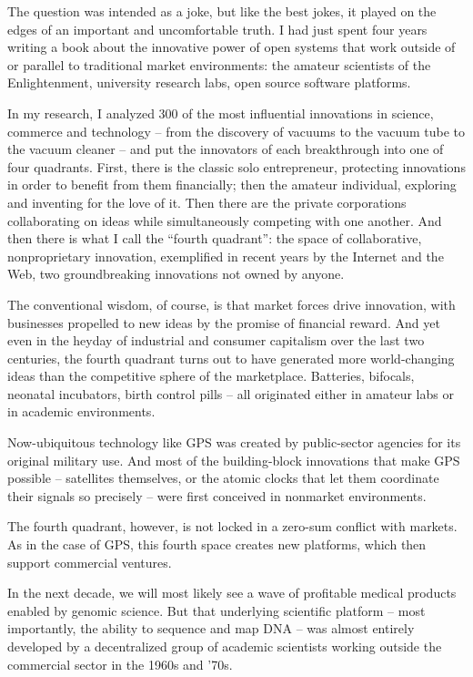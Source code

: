 ﻿\documentclass[12pt]{article}
\begin{document}
The question was intended as a joke, but like the best jokes, it played on the edges of an important
and uncomfortable truth. I had just spent four years writing a book about the innovative power of
open systems that work outside of or parallel to traditional market environments: the amateur
scientists of the Enlightenment, university research labs, open source software platforms.

In my research, I analyzed 300 of the most influential innovations in science, commerce and
technology -- from the discovery of vacuums to the vacuum tube to the vacuum cleaner -- and put the
innovators of each breakthrough into one of four quadrants. First, there is the classic solo
entrepreneur, protecting innovations in order to benefit from them financially; then the amateur
individual, exploring and inventing for the love of it. Then there are the private corporations
collaborating on ideas while simultaneously competing with one another. And then there is what I
call the ``fourth quadrant'': the space of collaborative, nonproprietary innovation, exemplified in
recent years by the Internet and the Web, two groundbreaking innovations not owned by anyone.

The conventional wisdom, of course, is that market forces drive innovation, with businesses
propelled to new ideas by the promise of financial reward. And yet even in the heyday of industrial
and consumer capitalism over the last two centuries, the fourth quadrant turns out to have generated
more world-changing ideas than the competitive sphere of the marketplace. Batteries, bifocals,
neonatal incubators, birth control pills -- all originated either in amateur labs or in academic
environments.

Now-ubiquitous technology like GPS was created by public-sector agencies for its original military
use. And most of the building-block innovations that make GPS possible -- satellites themselves, or
the atomic clocks that let them coordinate their signals so precisely -- were first conceived in
nonmarket environments.

The fourth quadrant, however, is not locked in a zero-sum conflict with markets. As in the case of
GPS, this fourth space creates new platforms, which then support commercial ventures.

In the next decade, we will most likely see a wave of profitable medical products enabled by genomic
science. But that underlying scientific platform -- most importantly, the ability to sequence and
map DNA -- was almost entirely developed by a decentralized group of academic scientists working
outside the commercial sector in the 1960s and '70s.
\end{document}
